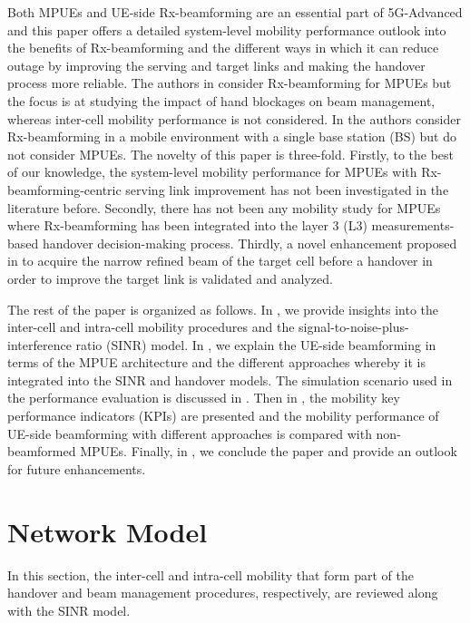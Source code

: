 \documentclass[10pt, conference]{IEEEtran}
\begin{document}
Both MPUEs and UE-side Rx-beamforming are an essential part of 5G-Advanced \cite{b6} and this paper offers a detailed system-level mobility performance outlook into the benefits of Rx-beamforming and the different ways in which it can reduce outage by improving the serving and target links and making the handover process more reliable. The authors in \cite{b61} consider Rx-beamforming for MPUEs but the focus is at studying the impact of hand blockages on beam management, whereas inter-cell mobility performance is not considered. In \cite{b62} the authors consider Rx-beamforming in a mobile environment with a single base station (BS) but do not consider MPUEs. The novelty of this paper is three-fold. Firstly, to the best of our knowledge, the system-level mobility performance for MPUEs with Rx-beamforming-centric serving link improvement has not been investigated in the literature before. Secondly, there has not been any mobility study for MPUEs where Rx-beamforming has been integrated into the layer 3 (L3) measurements-based handover decision-making process. Thirdly, a novel enhancement proposed in \cite{b65} to acquire the narrow refined beam of the target cell before a handover in order to improve the target link is validated and analyzed. 

The rest of the paper is organized as follows. In , we provide insights into the inter-cell and intra-cell mobility procedures and the signal-to-noise-plus-interference ratio (SINR) model. In  , we explain the UE-side beamforming in terms of the MPUE architecture and the different approaches whereby it is integrated into the SINR and handover models. The simulation scenario used in the performance evaluation is discussed in . Then in , the mobility key performance indicators (KPIs) are presented and the mobility performance of UE-side beamforming with different approaches is compared with non-beamformed MPUEs. Finally, in , we conclude the paper and provide an outlook for future enhancements.

%
\section{Network Model} \label{Section2}
In this section, the inter-cell and intra-cell mobility that form part of the handover and beam management procedures, respectively, are reviewed along with the SINR model. 

%
\end{document}
